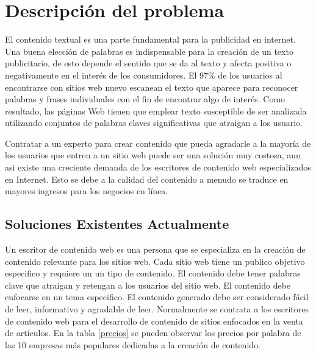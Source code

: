 
\chapter{Descripción del problema}

El contenido textual es una parte fundamental para la publicidad en internet. Una buena elección de palabras es indispensable para la creación de un texto publicitario, de esto depende el sentido que se da al texto y afecta positiva o negativamente en el interés de los consumidores. El 97\% de los usuarios al encontrarse con sitios web nuevo escanean el texto que aparece para reconocer palabras y frases individuales con el fin de encontrar algo de interés.\cite{nielsen1997users} Como resultado, las páginas Web tienen que emplear texto susceptible de ser analizada utilizando conjuntos de palabras claves significativas que atraigan a los usuario. 

Contratar a un experto para crear contenido que pueda agradarle a la mayoría de los usuarios que entren a un sitio web puede ser una solución muy costosa, aun asi existe una creciente demanda de los escritores de contenido web especializados en Internet. Esto se debe a la calidad del contenido a menudo se traduce en mayores ingresos para los negocios en línea.\cite{kulkarni2014choose}

\clearpage
\section{Soluciones Existentes Actualmente}

Un escritor de contenido web es una persona que se especializa en la creación de contenido relevante para los sitios web. Cada sitio web tiene un publico objetivo especifico y requiere un un tipo de contenido. El contenido debe tener palabras clave que atraigan y retengan a los usuarios del sitio web. El contenido debe enfocarse en un tema especifico. El contenido generado debe ser considerado fácil de leer, informativo y agradable de leer. Normalmente se contrata a los escritores de contenido web para el desarrollo de contenido de sitios enfocados en la venta de artículos. En la tabla \ref{precios} se pueden observar los precios por palabra de las 10 empresas más populares dedicadas a la creación de contenido.

